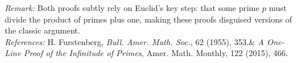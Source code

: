{\textit{Remark:} Both proofs subtly rely on Euclid’s key step: that some prime \( p \) must divide the product of primes plus one, making these proofs disguised versions of the classic argument.\\

\textit{References:}  
H. Furstenberg, \textit{Bull. Amer. Math. Soc.}, 62 (1955), 353.\& \textit{A One-Line Proof of the Infinitude of Primes}, Amer. Math. Monthly, 122 (2015), 466.
}
